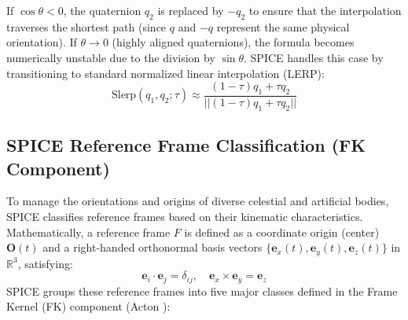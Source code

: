 \documentclass{acta}
\begin{document}
If $\cos\theta < 0$, the quaternion $q_2$ is replaced by $-q_2$ to ensure that the interpolation traverses the shortest path (since $q$ and $-q$ represent the same physical orientation). If $\theta \to 0$ (highly aligned quaternions), the formula becomes numerically unstable due to the division by $\sin\theta$. SPICE handles this case by transitioning to standard normalized linear interpolation (LERP):
\begin{equation}
\text{Slerp}(q_1, q_2; \tau) \approx \frac{(1-\tau)q_1 + \tau q_2}{||(1-\tau)q_1 + \tau q_2||}
\end{equation}

\subsection{SPICE Reference Frame Classification (FK Component)}
To manage the orientations and origins of diverse celestial and artificial bodies, SPICE classifies reference frames based on their kinematic characteristics. Mathematically, a reference frame $F$ is defined as a coordinate origin (center) $\mathbf{O}(t)$ and a right-handed orthonormal basis vectors $\{ \mathbf{e}_x(t), \mathbf{e}_y(t), \mathbf{e}_z(t) \}$ in $\mathbb{R}^3$, satisfying:
\begin{equation}
\mathbf{e}_i \cdot \mathbf{e}_j = \delta_{ij}, \quad \mathbf{e}_x \times \mathbf{e}_y = \mathbf{e}_z
\end{equation}
SPICE groups these reference frames into five major classes defined in the Frame Kernel (FK) component (Acton ):
\end{document}

